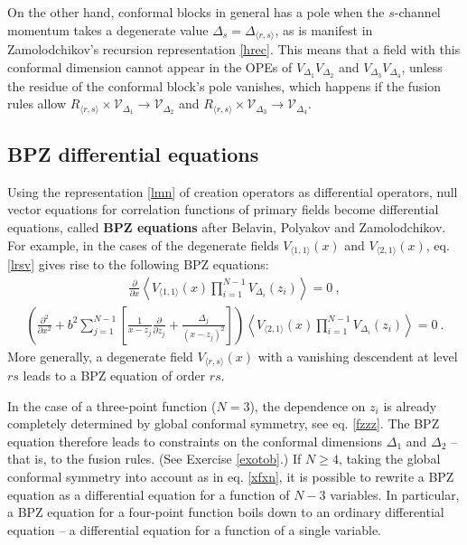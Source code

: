 \documentclass[12pt, a4paper, notitlepage, twoside]{report}
\numberwithin{equation}{section}
\theoremstyle{break}
\begin{document}
On the other hand, conformal blocks in general has a pole when the $s$-channel momentum takes a degenerate value $\Delta_s=\Delta_{\langle r,s\rangle}$, as is manifest in Zamolodchikov's recursion representation \eqref{hrec}.
This means that a field with this conformal dimension cannot appear in the OPEs of $V_{\Delta_1}V_{\Delta_2}$ and $V_{\Delta_3}V_{\Delta_4}$, unless the residue of the conformal block's pole vanishes, which happens if
the fusion rules allow $R_{\langle r,s \rangle}\times \mathcal{V}_{\Delta_1}\to \mathcal{V}_{\Delta_2}$ and $R_{\langle r,s \rangle}\times \mathcal{V}_{\Delta_3}\to \mathcal{V}_{\Delta_4}$.



\subsection{BPZ differential equations \label{secbpz}}

Using the representation \eqref{lmn} of creation operators as differential operators, null vector equations for correlation functions of primary fields become differential equations, called \textbf{\boldmath BPZ equations} after Belavin, Polyakov and Zamolodchikov. 
For example, in the cases of the degenerate fields $V_{\langle 1,1 \rangle}(x)$ and $V_{\langle 2,1 \rangle}(x)$, eq. \eqref{lrsv} gives rise to the following BPZ equations: 
\begin{align}
 {\frac{\partial}{\partial x}} \left\langle V_{\langle 1,1 \rangle}(x) \prod_{i=1}^{N-1} V_{\Delta_i}(z_i) \right\rangle = 0 \ ,
\label{pvoo} 
\end{align}
\begin{align}
\boxed{\left( \frac{\partial^2}{\partial x^2}  +b^2 \sum_{j=1}^{N-1} \left[\frac{1}{x-z_j}{\frac{\partial}{\partial z_j}}+ \frac{\Delta_j}{(x-z_j)^2} \right]\right)\left\langle V_{\langle 2,1 \rangle}(x) \prod_{i=1}^{N-1} V_{\Delta_i}(z_i) \right\rangle = 0} \ .
\label{pvot}
\end{align}
More generally, a degenerate field $V_{\langle r,s \rangle}(x)$ with a vanishing descendent at level $rs$ leads to a BPZ equation of order $rs$. 

In the case of a three-point function ($N=3$), the dependence on $z_i$ is already completely determined by global conformal symmetry, see eq. \eqref{fzzz}.
The BPZ equation therefore leads to constraints on the conformal dimensions $\Delta_1$ and $\Delta_2$ -- that is, to the fusion rules. (See Exercise \ref{exotob}.) If $N\geq 4$, taking the global conformal symmetry into account as in eq. \eqref{xfxn}, it is possible to rewrite a BPZ equation as a differential equation for a function of $N-3$ variables.
In particular, a BPZ equation for a four-point function boils down to an ordinary differential equation -- a differential equation for a function of a single variable.  
\end{document}
